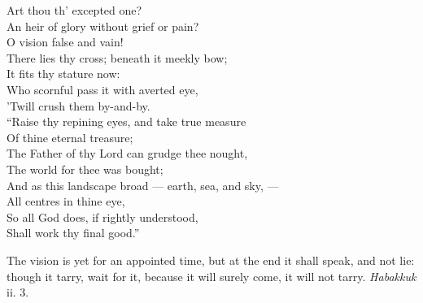  Art thou th’ excepted one? \\
 An heir of glory without grief or pain? \\
 O vision false and vain! \\
 There lies thy cross; beneath it meekly bow; \\
 It fits thy stature now: \\
 Who scornful pass it with averted eye, \\
 ’Twill crush them by-and-by. \\
  “Raise thy repining eyes, and take true measure \\
 Of thine eternal treasure; \\
 The Father of thy Lord can grudge thee nought, \\
 The world for thee was bought; \\
 And as this landscape broad — earth, sea, and sky, — \\
 All centres in thine eye, \\
 So all God does, if rightly understood, \\
 Shall work thy final good.”\\


The vision is yet for an appointed time, but at the end it shall speak, and not lie: though it tarry, wait for it, because it will surely come, it will not tarry. \emph{Habakkuk} ii. 3.

